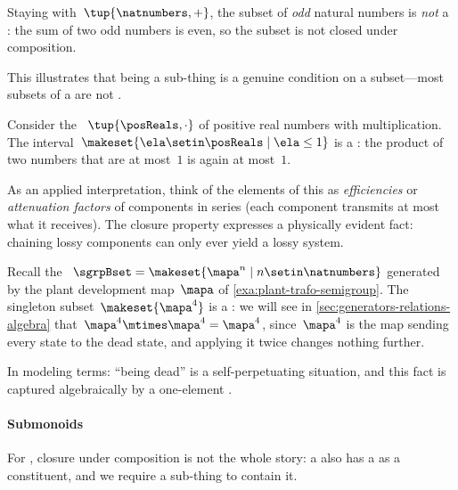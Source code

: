 \begin{example}
    \label{exa:oddnum-not-subsemigroup}
    Staying with~$\tup{\natnumbers,+}$, the subset of \emph{odd} natural numbers is \emph{not} a : the sum of two odd numbers is even, so the subset is not closed under composition.

    This illustrates that being a sub-thing is a genuine condition on a subset---most subsets of a  are not .
\end{example}

\begin{example}
    Consider the ~$\tup{\posReals, \cdot}$ of positive real numbers with multiplication.
    The interval~$\makeset{ \ela \setin \posReals \mid \ela \leq 1 }$ is a : the product of two numbers that are at most~$1$ is again at most~$1$.

    As an applied interpretation, think of the elements of this  as \emph{efficiencies} or \emph{attenuation factors} of components in series (each component transmits at most what it receives).
    The closure property expresses a physically evident fact: chaining lossy components can only ever yield a lossy system.
\end{example}

\begin{example}
    Recall the ~$\sgrpBset = \makeset{ \mapa^n \mid n \setin \natnumbers }$ generated by the plant development map~$\mapa$ of \cref{exa:plant-trafo-semigroup}.
    The singleton subset~$\makeset{ \mapa^4 }$ is a : we will see in \cref{sec:generators-relations-algebra} that~$\mapa^4 \mtimes \mapa^4 = \mapa^4$, since~$\mapa^4$ is the map sending every state to the dead state, and applying it twice changes nothing further.

    In modeling terms: ``being dead'' is a self-perpetuating situation, and this fact is captured algebraically by a one-element .
\end{example}

\paragraph{Submonoids}

For , closure under composition is not the whole story: a  also has a  as a constituent, and we require a sub-thing to contain it.

